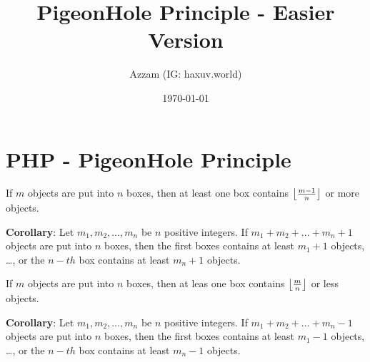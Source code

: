 \documentclass[12pt]{scrartcl}
\title{PigeonHole Principle - Easier Version}
\author{Azzam (IG: haxuv.world)}
\date{\today}
\begin{document}
\maketitle

\renewcommand*\contentsname{Daftar Isi}
\tableofcontents

\newpage
\section{PHP - PigeonHole Principle}
\begin{definition}
     If $m$ objects are put into $n$ boxes, then at least one box contains $\left\lfloor \frac{m-1}{n} \right\rfloor$ or more objects.
\end{definition}

\textbf{Corollary}: Let $m_1, m_2, \dots, m_n$ be $n$ positive integers. If $m_1+m_2+\dots+m_n+1$ objects are put into $n$ boxes, then the first boxes contains at least $m_1+1$ objects, \dots, or the $n-th$ box contains at least $m_n+1$ objects.

\begin{definition}
    If $m$ objects are put into $n$ boxes, then at leas one box contains $\left\lfloor \frac{m}{n} \right\rfloor$ or less objects.
\end{definition}

\textbf{Corollary}: Let $m_1, m_2, \dots, m_n$ be $n$ positive integers. If $m_1+m_2+\dots+m_n-1$ objects are put into $n$ boxes, then the first boxes contains at least $m_1-1$ objects, \dots, or the $n-th$ box contains at least $m_n-1$ objects.
\end{document}
